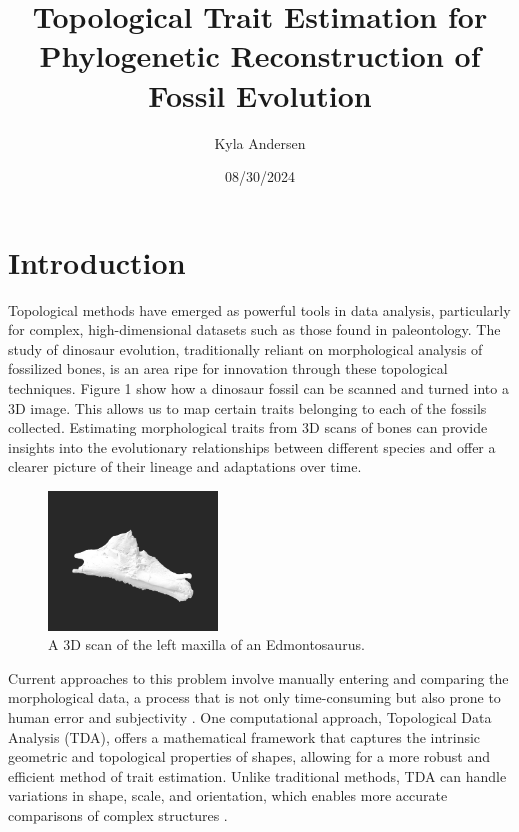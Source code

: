 \documentclass[12pt]{article}
\begin{document}
\title{Topological Trait Estimation for Phylogenetic Reconstruction of Fossil
Evolution}
\author{Kyla Andersen}
\date{08/30/2024}
\maketitle

\doublespacing

\section{Introduction}
Topological methods have emerged as powerful tools in data analysis,
particularly for complex, high-dimensional datasets such as those found in
paleontology. The study of dinosaur evolution, traditionally reliant on
morphological analysis of fossilized bones, is an area ripe for innovation
through these topological techniques. Figure 1 show how a dinosaur fossil can
be scanned and turned into a 3D image. This allows us to map certain traits
belonging to each of the fossils collected. Estimating morphological traits from 3D
scans of bones can provide insights into the evolutionary relationships between
different species and offer a clearer picture of their lineage and adaptations
over time. 

\begin{figure}
	\centering
	\includegraphics[width=0.4\textwidth]{dino_bone.png}
	\caption{A 3D scan of the left maxilla of an Edmontosaurus.}
	\label{fig:dino_maxilla}
\end{figure}


Current approaches to this problem involve manually entering and comparing the
morphological data, a process that is not only time-consuming but also prone to
human error and subjectivity \citep{bates2009}. One computational approach, Topological 
Data Analysis (TDA), offers a mathematical framework that captures the intrinsic 
geometric and topological properties of shapes, allowing for a more robust and 
efficient method of trait estimation. Unlike traditional methods, TDA can handle 
variations in shape, scale, and orientation, which enables more accurate
comparisons of complex structures \citep{zomorodian2009}.
\end{document}
